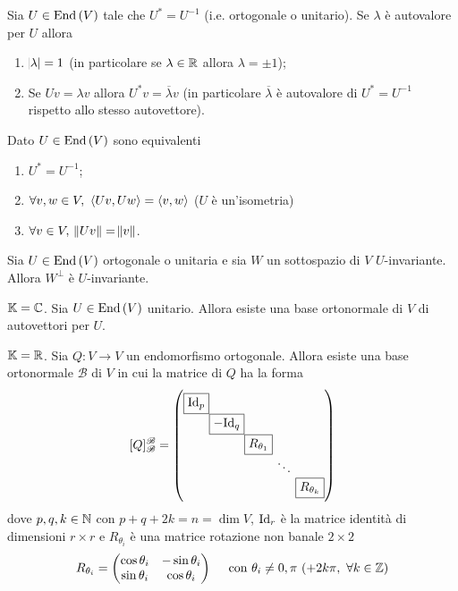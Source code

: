 \begin{thm}
	Sia $ U \in \operatorname{End}{(V)} $ tale che $ U^{*} = U^{-1} $ (i.e. ortogonale o unitario). Se $ \lambda $ è autovalore per $ U $ allora 
	\begin{enumerate}[label = (\roman*)]
		\item $ \abs{\lambda} = 1 $ (in particolare se $ \lambda \in \mathbb{R} $ allora $ \lambda  = \pm 1 $);
		\item Se $ U v = \lambda v $ allora $ U^{*} v = \overline{\lambda} v $ (in particolare $ \overline{\lambda} $ è autovalore di $ U^{*} = U^{-1} $ rispetto allo stesso autovettore). 
	\end{enumerate}
\end{thm}

\begin{thm}
	Dato $ U \in \operatorname{End}{(V)} $ sono equivalenti
	\begin{enumerate}[label = (\roman*)]
		\item $ U^{*} = U^{-1} $;
		\item $ \forall v, w \in V, \ \langle Uv, Uw \rangle = \langle v, w \rangle $ ($ U $ è un'isometria)
		\item $ \forall v \in V, \ \norm{Uv} = \norm{v} $.
	\end{enumerate}
\end{thm}

\begin{prop}
	Sia $ U \in \operatorname{End}{(V)} $ ortogonale o unitaria e sia $ W $ un sottospazio di $ V $ $ U $-invariante. Allora $ W^{\perp} $ è $ U $-invariante.
\end{prop}

\begin{thm}
	$ \mathbb{K} = \mathbb{C} $. Sia $ U \in \operatorname{End}{(V)} $ unitario. Allora esiste una base ortonormale di $ V $ di autovettori per $ U $.
\end{thm}

\begin{thm}
	$ \mathbb{K} = \mathbb{R} $. Sia $ Q \colon V \to V $ un endomorfismo ortogonale. Allora esiste una base ortonormale $ \mathscr{B} $ di $ V $ in cui la matrice di $ Q $ ha la forma
	\[[Q]_{\mathscr{B}}^{\mathscr{B}} = 
	\setlength{\arraycolsep}{0pt}
	\begin{pmatrix}
	\fbox{$ \Id_{p} $} &  &  &  &  \\ 
	& \fbox{$ - \Id_{q} $} &  &  &  \\ 
	&  &\fbox{$ R_{\theta_1} $} &  &  \\ 
	&  &  & \ \ddots \ &  \\ 
	&  &  &  & \fbox{$ R_{\theta_k} $}
	\end{pmatrix} \]
	dove $ p, q, k \in \mathbb{N} $ con $ p + q + 2 k = n = \dim{V} $, $ \mathrm{Id}_r $ è la matrice identità di dimensioni $ r \times r $ e $ R_{\theta_i} $ è una matrice rotazione non banale $ 2 \times 2 $ 
	\[R_{\theta_i} = 
	\begin{pmatrix}
	\cos{\theta_i} & - \sin{\theta_i} \\
	\sin{\theta_i} & \cos{\theta_i}
	\end{pmatrix}
	\quad
	\text{ con $ \theta_{i} \neq 0, \pi $ ($ + 2 k \pi, \ \forall k \in \mathbb{Z} $)}\] 
\end{thm}

